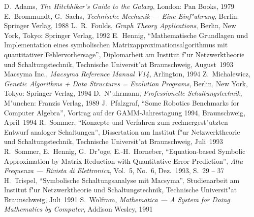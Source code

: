 \begin{thebibliography}{CCC\_99x}
 D.~Adams, {\em The Hitchhiker's Guide to the
Galaxy}, London: Pan Books, 1979
 E.~Brommundt, G.~Sachs, {\em Technische 
Mechanik --- Eine Einf"uhrung}, Berlin: Springer Verlag, 1988
 L.~R.~Foulds, {\em Graph Theory Applications}, 
Berlin, New York, Tokyo: Springer Verlag, 1992
 E.~Hennig, ``Mathematische Grundlagen und 
Implementation eines symbolischen Matrixapproximationsalgorithmus mit 
quantitativer Fehlervorhersage'', Diplomarbeit am Institut f"ur
Netzwerktheorie und Schaltungstechnik, Technische Universit"at
Braunschweig, August~1993
 Macsyma Inc., {\em Macsyma Reference Manual 
V14},  Arlington, 1994
 Z.~Michalewicz, {\em Genetic Algorithms + 
Data Structures = Evolution Programs}, Berlin, New York, Tokyo: Springer 
Verlag, 1994
 D.~N"uhrmann, {\em Professionelle 
Schaltungstechnik}, M"unchen: Franzis Verlag, 1989
 J.~Pfalzgraf, ``Some Robotics Benchmarks for
Computer Algebra'', Vortrag auf der GAMM-Jahrestagung 1994, Braunschweig,
April~1994
 R.~Sommer, ``Konzepte und Verfahren zum
rechnergest"utzten Entwurf analoger Schaltungen'', Dissertation am Institut
f"ur Netzwerktheorie und Schaltungstechnik, Technische Universit"at
Braunschweig, Juli~1993
 R.~Sommer, E.~Hennig, G.~Dr"oge, E.-H.~Horneber, 
``Equation-based Symbolic Approximation by Matrix Reduction with 
Quantitative Error Prediction'', {\em Alta Frequenza --- Rivista di 
Elettronica}, Vol.~5, No.~6, Dez.~1993, S.~29 -- 37
 H.~Trispel, ``Symbolische Schaltungsanalyse
mit Macsyma'', Studienarbeit am Institut f"ur Netzwerktheorie und
Schaltungstechnik, Technische Universit"at Braunschweig, Juli~1991
 S.~Wolfram, {\em Mathematica --- A System for 
Doing Mathematics by Computer}, Addison Wesley, 1991
\end{thebibliography}
